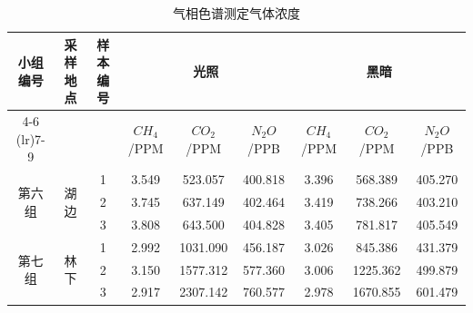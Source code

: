 \documentclass[10.5pt]{config}
\begin{document}
\begin{table}[h]
    \centering %
    
    \caption{气相色谱测定气体浓度} 
    \label{tab:gc-concentration} %
    
    \begin{tabular}{ccccccccc}
        \toprule
        \multirow{2}{*}{小组编号} & \multirow{2}{*}{采样地点} & \multirow{2}{*}{样本编号} & \multicolumn{3}{c}{光照} & \multicolumn{3}{c}{黑暗} \\
        
        \cmidrule(lr){4-6} \cmidrule(lr){7-9}
        & & & $CH_4$/PPM & $CO_2$/PPM & $N_2O$/PPB & $CH_4$/PPM & $CO_2$/PPM & $N_2O$/PPB \\
        \midrule
        
        \multirow{3}{*}{第六组} & \multirow{3}{*}{湖边} 
        & 1 & 3.549 & 523.057 & 400.818 & 3.396 & 568.389 & 405.270 \\
        & & 2 & 3.745 & 637.149 & 402.464 & 3.419 & 738.266 & 403.210 \\
        & & 3 & 3.808 & 643.500 & 404.828 & 3.405 & 781.817 & 405.549 \\
        
        \midrule %
        
        \multirow{3}{*}{第七组} & \multirow{3}{*}{林下} 
        & 1 & 2.992 & 1031.090 & 456.187 & 3.026 & 845.386 & 431.379 \\
        & & 2 & 3.150 & 1577.312 & 577.360 & 3.006 & 1225.362 & 499.879 \\
        & & 3 & 2.917 & 2307.142 & 760.577 & 2.978 & 1670.855 & 601.479 \\
        
        \bottomrule
    \end{tabular}
\end{table}
\end{document}
